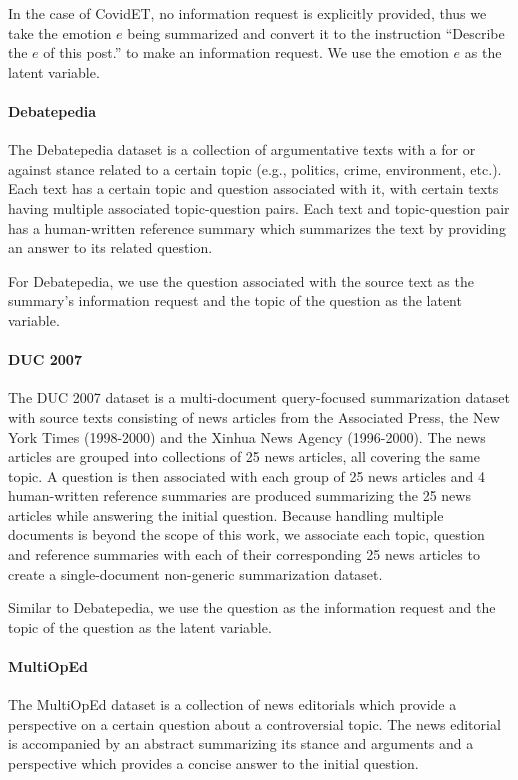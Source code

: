 \documentclass[11pt]{article}
\begin{document}
In the case of CovidET, no information request is explicitly provided, thus we take the emotion $e$ being summarized and convert it to the instruction ``Describe the $e$ of this post.'' to make an information request. We use the emotion $e$ as the latent variable.

\paragraph{Debatepedia} The Debatepedia dataset \citep{nema-etal-2017-diversity} is a collection of argumentative texts with a for or against stance related to a certain topic (e.g., politics, crime, environment, etc.). Each text has a certain topic and question associated with it, with certain texts having multiple associated topic-question pairs. Each text and topic-question pair has a human-written reference summary which summarizes the text by providing an answer to its related question.

For Debatepedia, we use the question associated with the source text as the summary's information request and the topic of the question as the latent variable.

\paragraph{DUC 2007}  The DUC 2007 dataset \citep{duc2007} is a multi-document query-focused summarization dataset with source texts consisting of news articles from the Associated Press, the New York Times (1998-2000) and the Xinhua News Agency (1996-2000). The news articles are grouped into collections of 25 news articles, all covering the same topic. A question is then associated with each group of 25 news articles and 4 human-written reference summaries are produced summarizing the 25 news articles while answering the initial question. Because handling multiple documents is beyond the scope of this work, we associate each topic, question and reference summaries with each of their corresponding 25 news articles to create a single-document non-generic summarization dataset.

Similar to Debatepedia, we use the question as the information request and the topic of the question as the latent variable.

\paragraph{MultiOpEd} The MultiOpEd dataset \citep{liu-etal-2021-multioped} is a collection of news editorials which provide a perspective on a certain question about a controversial topic. The news editorial is accompanied by an abstract summarizing its stance and arguments and a perspective which provides a concise answer to the initial question.
\end{document}

